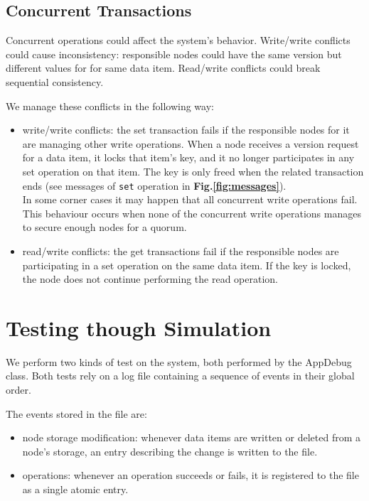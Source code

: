 \documentclass{article}
\begin{document}
\subsection{Concurrent Transactions}
Concurrent operations could affect the system's behavior. Write/write
conflicts could cause inconsistency: responsible nodes could have the same version
but different values for for same data item. Read/write conflicts could break
sequential consistency.

We manage these conflicts in the following way:
\begin{itemize}
    \item write/write conflicts: the set transaction fails if the responsible 
    nodes for it are managing other write operations. When a node receives 
    a version request for a data item, it locks that item's key, and it no longer
    participates in any set operation on that item.
    The key is only freed when the related transaction ends (see messages of
    \texttt{set} operation in \textbf{Fig.\ref{fig:messages}}). \\
    In some corner cases it may happen that all concurrent write operations fail.
    This behaviour occurs when none of the concurrent write operations manages to
    secure enough nodes for a quorum.
    \item read/write conflicts: the get transactions fail if the responsible
    nodes are participating in a set operation on the same data item. If the
    key is locked, the node does not continue performing the read operation.
\end{itemize}

\section{Testing though Simulation}
We perform two kinds of test on the system, both performed by the AppDebug class. 
Both tests rely on a log file containing a sequence of events in their global order.

The events stored in the file are:
\begin{itemize}
    \item node storage modification: whenever data items are written or deleted 
    from a node's storage, an entry describing the change is written to the file.
    \item operations: whenever an operation succeeds or fails, it is registered 
    to the file as a single atomic entry.
\end{itemize}
\end{document}
